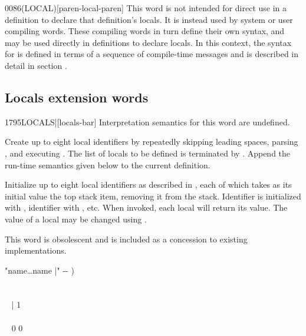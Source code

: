 \begin{worddef}[LOCAL]{0086}{(LOCAL)}[paren-local-paren]
\note
	This word is not intended for direct use in a definition to
	declare that definition's locals. It is instead used by system
	or user compiling words. These compiling words in turn define
	their own syntax, and may be used directly in definitions to
	declare locals. In this context, the syntax for 
	is defined in terms of a sequence of compile-time messages and
	is described in detail in section .

\end{worddef}


\pagebreak
\subsection{Locals extension words} %
\extended\vspace{1ex}


\begin{worddef}[LOCALS]{1795}{LOCALS|}[locals-bar]
\interpret
	Interpretation semantics for this word are undefined.

\compile

	Create up to eight local identifiers by repeatedly skipping
	leading spaces, parsing , and executing
	. The list of locals to be defined
	is terminated by \param{|}. Append the run-time semantics given
	below to the current definition.

\runtime

	Initialize up to eight local identifiers as described in
	, each of which takes as its
	initial value the top stack item, removing it from the stack.
	Identifier  is initialized with ,
	identifier  with , etc. When invoked,
	each local will return its value. The value of a local may be
	changed using .

\note This word is obsolescent and is included as a concession to
	existing implementations.

	\begin{implement} %
	\word{:}   "name{\ldots}name |" -{}- ) \\
	\tab {} \\
	\tab~   ~    \\
	\tab~ \word{[CHAR]} | \word{-}  1 \word{-}  ~  \\
	\tab~  \\
	\tab {}  ~ 0 0  \\
	\word{;} 
	\end{implement}

\end{worddef}


